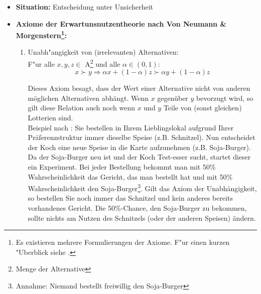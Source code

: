 \documentclass[11pt]{article}
\begin{document}
\begin{itemize}
\item \textbf{Situation:} Entscheidung unter Unsicherheit

\item \textbf{Axiome der Erwartunsnutzentheorie nach Von Neumann
    \& Morgenstern\footnote{Es existieren mehrere Formulierungen der Axiome. F"ur einen kurzen "Uberblick siehe \textcite[S. 689]{barbera2004handbook}.}:} \parencites[siehe][S. 689f.;]{barbera2004handbook}[S. 190ff.;]{rieck2012spieltheorie}[S. 24ff.]{von1955theory}
  
  \begin{enumerate}
  \item Unabh"angigkeit von (irrelevanten) Alternativen:\\
    F"ur alle $x, y, z \in$ A\footnote{Menge der Alternative} und alle $\alpha \in (0,1)$:\\
    \begin{equation}
      \label{eq:4}
      x \succ y \Rightarrow \alpha x +(1-\alpha) z \succ \alpha y + (1-\alpha) z  \tag{Unabh"angigkeit}
    \end{equation}

    Dieses Axiom besagt, dass der Wert einer Alternative nicht von anderen m\"oglichen Alternativen abh\"angt. Wenn $x$ gegen\"uber $y$ bevorzugt wird, so gilt diese Relation auch noch wenn $x$ und $y$ Teile von (sonst gleichen) Lotterien sind.\\
    Beispiel nach \textcite[S. 7]{osborne2004introduction}: Sie bestellen in Ihrem Lieblingslokal aufgrund Ihrer Pr\"aferenzstruktur immer dieselbe Speise (z.B. Schnitzel). Nun entscheidet der Koch eine neue Speise in die Karte aufzunehmen (z.B. Soja-Burger). Da der Soja-Burger neu ist und der Koch Test-esser sucht, startet dieser ein Experiment. Bei jeder Bestellung bekommt man mit 50\% Wahrscheinlichkeit das Gericht, das man bestellt hat und mit 50\% Wahrscheinlichkeit den Soja-Burger\footnote{Annahme: Niemand bestellt freiwillig den Soja-Burger}. Gilt das Axiom der Unabh\"angigkeit, so bestellen Sie noch immer das Schnitzel und kein anderes bereits vorhandenes Gericht. Die 50\%-Chance, den Soja-Burger zu bekommen, sollte nichts am Nutzen des Schnitzels (oder der anderen Speisen) \"andern. 



\end{enumerate}
\end{itemize}
\end{document}
